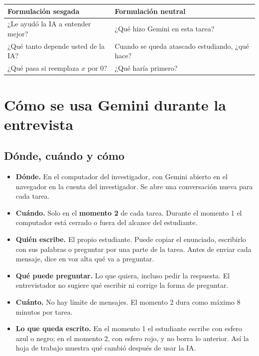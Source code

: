 \documentclass[11pt,letterpaper]{article}
\newcounter{preg}
\begin{document}
\begin{center}
\small
\renewcommand{\arraystretch}{1.3}
\begin{tabularx}{\linewidth}{@{}LL@{}}
\toprule
\textbf{Formulación sesgada} & \textbf{Formulación neutral}\\
\midrule
¿Le ayudó la IA a entender mejor? & ¿Qué hizo Gemini en esta tarea?\\
¿Qué tanto depende usted de la IA? & Cuando se queda atascado estudiando, ¿qué hace?\\
¿Qué pasa si reemplaza $x$ por 0? & ¿Qué haría primero?\\
\bottomrule
\end{tabularx}
\end{center}

\section{Cómo se usa Gemini durante la entrevista}\label{sec:usoia}

\subsection{Dónde, cuándo y cómo}
\begin{itemize}
  \item \textbf{Dónde.} En el computador del investigador, con Gemini abierto en el navegador en la cuenta del investigador. Se abre una conversación nueva para cada tarea.
  \item \textbf{Cuándo.} Solo en el \textbf{momento 2} de cada tarea. Durante el momento 1 el computador está cerrado o fuera del alcance del estudiante.
  \item \textbf{Quién escribe.} El propio estudiante. Puede copiar el enunciado, escribirlo con sus palabras o preguntar por una parte de la tarea. Antes de enviar cada mensaje, dice en voz alta qué va a preguntar.
  \item \textbf{Qué puede preguntar.} Lo que quiera, incluso pedir la respuesta. El entrevistador no sugiere qué escribir ni corrige la forma de preguntar.
  \item \textbf{Cuánto.} No hay límite de mensajes. El momento 2 dura como máximo 8 minutos por tarea.
  \item \textbf{Lo que queda escrito.} En el momento 1 el estudiante escribe con esfero azul o negro; en el momento 2, con esfero rojo, y no borra lo anterior. Así la hoja de trabajo muestra qué cambió después de usar la IA.
\end{itemize}
\end{document}
